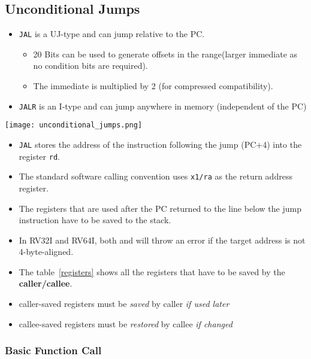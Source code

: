 \subsection{Unconditional Jumps}

\begin{itemize}
    \item \texttt{JAL} is a UJ-type and can jump relative to the PC.\
          \begin{itemize}
              \item 20 Bits can be used to generate offsets in the range\newline [-1 MB, 1 MB] (larger immediate as no condition bits are required).
              \item The immediate is multiplied by 2 (for compressed compatibility).
          \end{itemize}
    \item \texttt{JALR} is an I-type and can jump anywhere in memory (independent of the PC)
\end{itemize}

\texttt{[image: unconditional\_jumps.png]}
\begin{itemize}
    \item \texttt{JAL} stores the address of the instruction following the jump (PC+4) into the register \texttt{rd}.
    \item The standard software calling convention uses \texttt{x1/ra} as the return address register.
    \item The registers that are used after the PC returned to the line below the jump instruction have to be saved to the stack.
    \item In RV32I and RV64I, both \code{JAL} and \code{JALR} will throw an error if the target address is not 4-byte-aligned.
    \item The table~\ref{registers} shows all the registers that have to be saved by the \textbf{caller/callee}.
    \item caller-saved registers must be \textit{saved} by caller \textit{if used later}
    \item callee-saved registers must be \textit{restored} by callee \textit{if changed}
\end{itemize}


\subsubsection{Basic Function Call}

